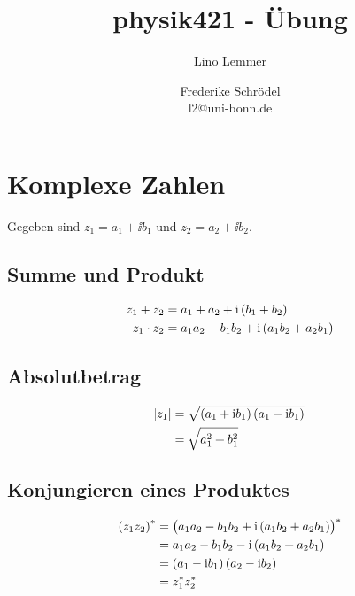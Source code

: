 

\setcounter{thezettel}{1}
\renewcommand\thesection{\arabic{thezettel}.\arabic{section}}

\title{physik421 - Übung }
\author{Lino Lemmer \and Frederike Schrödel \\ \small{l2@uni-bonn.de}}


\maketitle

\section{Komplexe Zahlen}

Gegeben sind $z_1 = a_1 + \ii b_1$ und $z_2 = a_2 + \ii b_2$.

\subsection{Summe und Produkt}

\begin{align*}
    z_1 + z_2 &= a_1 + a_2 + \ii\del{b_1 + b_2} \\
    z_1 \cdot z_2 &= a_1a_2 - b_1b_2 + \ii\del{a_1b_2+a_2b_1}
\end{align*}

\subsection{Absolutbetrag}

\begin{align*}
    \abs{z_1} &= \sqrt{\del{a_1 + \ii b_1}\del{a_1 - \ii b_1}} \\
              &= \sqrt{a_1^2 + b_1^2}
\end{align*}

\subsection{Konjungieren eines Produktes}

\begin{align*}
    \del{z_1z_2}^* &= \del{a_1a_2 - b_1b_2 + \ii\del{a_1b_2 + a_2b_1}}^* \\
                   &= a_1a_2 - b_1b_2 - \ii\del{a_1b_2 + a_2b_1} \\
                   &= \del{a_1 - \ii b_1}\del{a_2 - \ii b_2} \\
                   &= z_1^* z_2^*
\end{align*}

